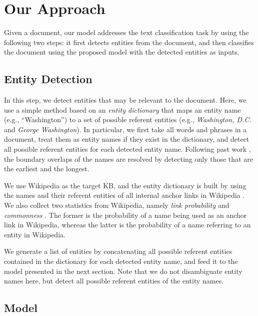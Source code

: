 \documentclass[11pt,a4paper]{article}
\begin{document}
    \section{Our Approach}

    Given a document, our model addresses the text classification task by using the following two steps: it first detects entities from the document, and then classifies the document using the proposed model with the detected entities as inputs.

    \subsection{Entity Detection}
    \label{subsec:entity-detection}

    In this step, we detect entities that may be relevant to the document.
    Here, we use a simple method based on an \textit{entity dictionary} that maps an entity name (e.g., ``Washington'') to a set of possible referent entities (e.g., \textit{Washington, D.C.} and \textit{George Washington}).
    In particular, we first take all words and phrases in a document, treat them as entity names if they exist in the dictionary, and detect all possible referent entities for each detected entity name.
    Following past work \cite{Hasibi2016,Xiong2016}, the boundary overlaps of the names are resolved by detecting only those that are the earliest and the longest.

    We use Wikipedia as the target KB, and the entity dictionary is built by using the names and their referent entities of all internal anchor links in Wikipedia \cite{StephenGuo}.
    We also collect two statistics from Wikipedia, namely \textit{link probability} and \textit{commonness} \cite{Mihalcea2007,Milne2008}. The former is the probability of a name being used as an anchor link in Wikipedia, whereas the latter is the probability of a name referring to an entity in Wikipedia.

    We generate a list of entities by concatenating all possible referent entities contained in the dictionary for each detected entity name, and feed it to the model presented in the next section.
    Note that we do not disambiguate entity names here, but detect all possible referent entities of the entity names.

    \subsection{Model}
    \label{subsec:model}
\end{document}
